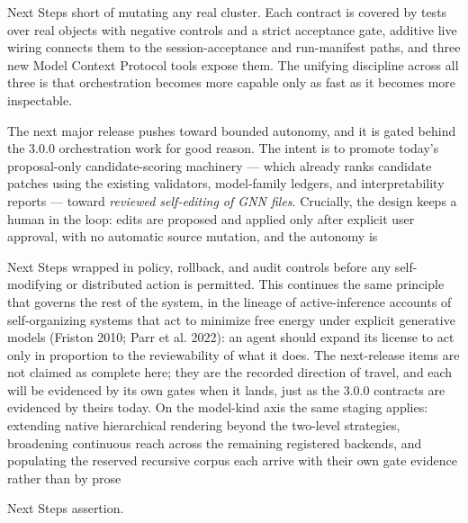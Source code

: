 \documentclass[
  ignorenonframetext,
]{beamer}
\begin{document}
\begin{frame}[allowframebreaks]{Next Steps}
short of mutating any real cluster. Each contract is covered by tests
over real objects with negative controls and a strict acceptance gate,
additive live wiring connects them to the session-acceptance and
run-manifest paths, and three new Model Context Protocol tools expose
them. The unifying discipline across all three is that orchestration
becomes more capable only as fast as it becomes more inspectable.

The next major release pushes toward bounded autonomy, and it is gated
behind the 3.0.0 orchestration work for good reason. The intent is to
promote today's proposal-only candidate-scoring machinery --- which
already ranks candidate patches using the existing validators,
model-family ledgers, and interpretability reports --- toward
\emph{reviewed self-editing of GNN files}. Crucially, the design keeps a
human in the loop: edits are proposed and applied only after explicit
user approval, with no automatic source mutation, and the autonomy is
\end{frame}

\begin{frame}[allowframebreaks]{Next Steps}
wrapped in policy, rollback, and audit controls before any
self-modifying or distributed action is permitted. This continues the
same principle that governs the rest of the system, in the lineage of
active-inference accounts of self-organizing systems that act to
minimize free energy under explicit generative models (Friston 2010;
Parr et al. 2022): an agent should expand its license to act only in
proportion to the reviewability of what it does. The next-release items
are not claimed as complete here; they are the recorded direction of
travel, and each will be evidenced by its own gates when it lands, just
as the 3.0.0 contracts are evidenced by theirs today. On the model-kind
axis the same staging applies: extending native hierarchical rendering
beyond the two-level strategies, broadening continuous reach across the
remaining registered backends, and populating the reserved recursive
corpus each arrive with their own gate evidence rather than by prose
\end{frame}

\begin{frame}[allowframebreaks]{Next Steps}
assertion.
\end{frame}
\end{document}
